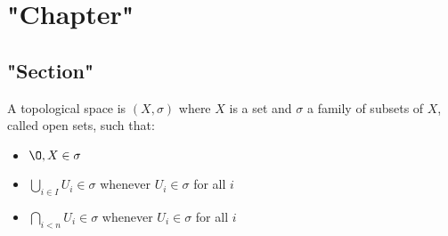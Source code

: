 \chapter{"Chapter"}
\setcounter{section}{-1}
\section{"Section"}

\begin{definition}["Definition"]
    A topological space is $(X, \sigma)$ where  $X$ is a set and $\sigma$
  a family of subsets of $X$, called  open sets, such that:
    \begin{itemize}
        \item $\O, X \in \sigma$
        \item $\bigcup_{i \in I} U_i \in \sigma$ whenever $ U_i \in \sigma$ for all $i$
        \item $\bigcap_{i<n} U_i \in \sigma$ whenever $ U_i \in \sigma$ for all $i$
    \end{itemize}
\end{definition}